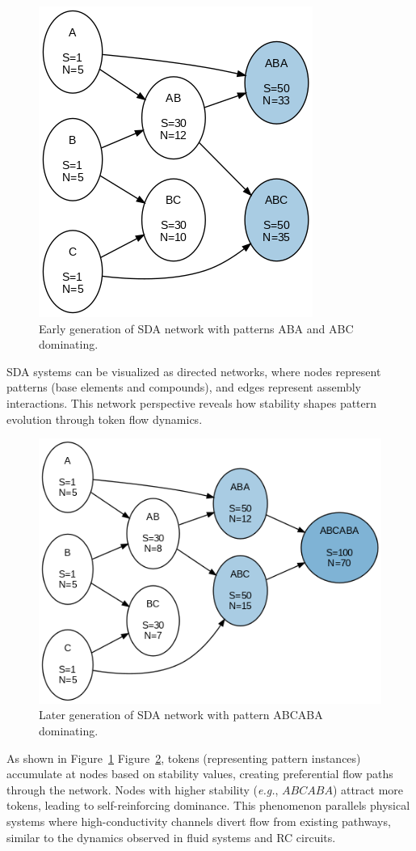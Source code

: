 \documentclass[preprint,12pt]{elsarticle}
\begin{document}
\begin{figure}[h]
    \centering
    \includegraphics[width=0.4\linewidth]{figure_11.png}
    \caption{Early generation of SDA network with patterns ABA and ABC dominating.}
    \label{fig:figure_11}
\end{figure}

SDA systems can be visualized as directed networks, where nodes represent patterns (base elements and compounds), and edges represent assembly interactions. This network perspective reveals how stability shapes pattern evolution through token flow dynamics.

\begin{figure}[h]
    \centering
    \includegraphics[width=0.5\linewidth]{figure_12.png}
    \caption{Later generation of SDA network with pattern ABCABA dominating.}
    \label{fig:figure_12}
\end{figure}

As shown in Figure~\ref{fig:figure_11} Figure~\ref{fig:figure_12}, tokens (representing pattern instances) accumulate at nodes based on stability values, creating preferential flow paths through the network. Nodes with higher stability (\textit{e.g.}, $ABCABA$) attract more tokens, leading to self-reinforcing dominance. This phenomenon parallels physical systems where high-conductivity channels divert flow from existing pathways, similar to the dynamics observed in fluid systems and RC circuits.
\end{document}
